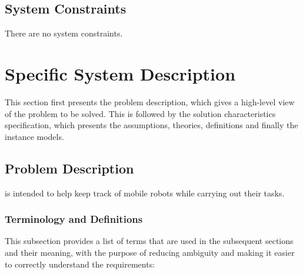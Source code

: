 \documentclass[12pt]{article}
\begin{document}
\subsection{System Constraints}

There are no system constraints.

\section{Specific System Description}

This section first presents the problem description, which gives a high-level
view of the problem to be solved.  This is followed by the solution characteristics
specification, which presents the assumptions, theories, definitions and finally
the instance models.

\subsection{Problem Description}\label{Sec_pd}

\progname is intended to help keep track of mobile robots while carrying out their tasks.

\subsubsection{Terminology and  Definitions}

This subsection provides a list of terms that are used in the subsequent
sections and their meaning, with the purpose of reducing ambiguity and making it
easier to correctly understand the requirements:
\end{document}
